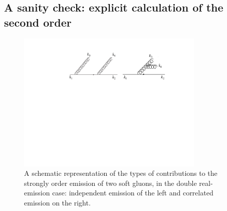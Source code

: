 \subsection{A sanity check: explicit calculation of the second order}\label{sec:sanity}
\begin{figure}[tb]
  \begin{center}
\includegraphics[width=0.8\textwidth]{figures/2gluons}
    \caption{A schematic representation of the types of contributions to the strongly order emission of two soft gluons, in the double real-emission case: independent emission  of the left and correlated emission on the right.}
    \label{fig:ind-corr}
  \end{center}
\end{figure}


